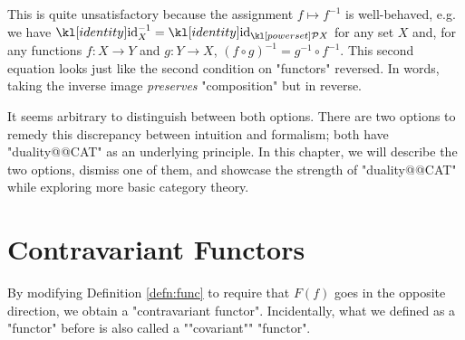 \documentclass[main.tex]{subfiles}
\begin{document}
This is quite unsatisfactory because the assignment $f \mapsto f^{-1}$ is well-behaved, e.g. we have $\id_X^{-1} = \id_{\mP X}$ for any set $X$ and, for any functions $f: X \rightarrow Y$ and $g: Y \rightarrow X$, $(f \circ g)^{-1} = g^{-1} \circ f^{-1}$. This second equation looks just like the second condition on "functors" reversed. In words, taking the inverse image \textit{preserves} "composition" but in reverse.

It seems arbitrary to distinguish between both options. There are two options to remedy this discrepancy between intuition and formalism; both have "duality@@CAT" as an underlying principle. In this chapter, we will describe the two options, dismiss one of them, and showcase the strength of "duality@@CAT" while exploring more basic category theory.
\section{Contravariant Functors}
By modifying Definition \ref{defn:func} to require that $F(f)$ goes in the opposite direction, we obtain a "contravariant functor". \AP Incidentally, what we defined as a "functor" before is also called a ""covariant"" "functor".
\end{document}
